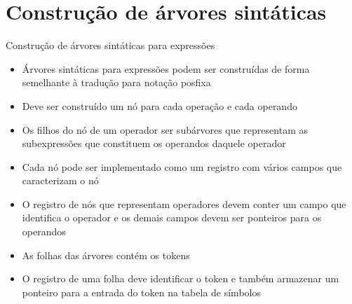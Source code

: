 \section{Construção de árvores sintáticas}

\begin{frame}[fragile]{Construção de árvores sintáticas para expressões}

    \begin{itemize}
        \item Árvores sintáticas para expressões podem ser construídas de forma semelhante à tradução para notação posfixa
        \pause

        \item Deve ser construído um nó para cada operação e cada operando
        \pause

        \item Os filhos do nó de um operador ser subárvores que representam as subexpressões que constituem os operandos daquele operador
        \pause

        \item Cada nó pode ser implementado como um registro com vários campos que caracterizam o nó
        \pause

        \item O registro de nós que representam operadores devem conter um campo que identifica o operador e os demais campos devem ser ponteiros para os
            operandos
        \pause

        \item As folhas das árvores contém os tokens
        \pause

        \item O registro de uma folha deve identificar o token e também armazenar um ponteiro para a entrada do token na tabela de símbolos
    \end{itemize}

\end{frame}

